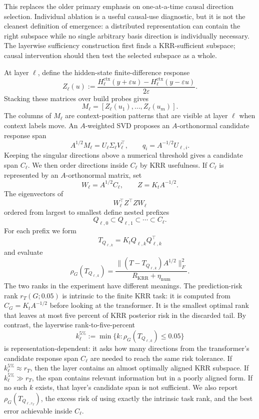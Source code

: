 \documentclass[11pt]{article}
\begin{document}
This replaces the older primary emphasis on one-at-a-time causal direction selection. Individual
ablation is a useful causal-use diagnostic, but it is not the cleanest definition of emergence: a
distributed representation can contain the right subspace while no single arbitrary basis direction
is individually necessary. The layerwise sufficiency construction first finds a KRR-sufficient
subspace; causal intervention should then test the selected subspace as a whole.

At layer \(\ell\), define the hidden-state finite-difference response
\[
Z_\ell(u)
:=
\frac{
H_\ell^{\mathrm{ctx}}(y+\varepsilon u)-H_\ell^{\mathrm{ctx}}(y-\varepsilon u)
}{2\varepsilon}.
\]
Stacking these matrices over build probes gives
\[
M_\ell=[Z_\ell(u_1),\ldots,Z_\ell(u_m)].
\]
The columns of \(M_\ell\) are context-position patterns that are visible at layer \(\ell\) when
context labels move. An \(A\)-weighted SVD proposes an \(A\)-orthonormal candidate response span
\[
A^{1/2}M_\ell=U_\ell\Sigma_\ell V_\ell^\top,
\qquad
q_i=A^{-1/2}U_{\ell,i}.
\]
Keeping the singular directions above a numerical threshold gives a candidate span \(C_\ell\). We
then order directions inside \(C_\ell\) by KRR usefulness. If \(C_\ell\) is represented by an
\(A\)-orthonormal matrix, set
\[
W_\ell=A^{1/2}C_\ell,
\qquad
Z=K_tA^{-1/2}.
\]
The eigenvectors of
\[
W_\ell^\top Z^\top ZW_\ell
\]
ordered from largest to smallest define nested prefixes
\[
Q_{\ell,0}\subset Q_{\ell,1}\subset\cdots\subset C_\ell.
\]
For each prefix we form
\[
T_{Q_{\ell,k}}=K_tQ_{\ell,k}Q_{\ell,k}^\top
\]
and evaluate
\[
\rho_G(T_{Q_{\ell,k}})
=
\frac{\|(T-T_{Q_{\ell,k}})A^{1/2}\|_F^2}{R_{\mathrm{KRR}}+\eta_{\mathrm{num}}}.
\]
The two ranks in the experiment have different meanings. The prediction-risk rank
\(r_T(G;0.05)\) is intrinsic to the finite KRR task: it is computed from
\(C_G=K_tA^{-1/2}\) before looking at the transformer. It is the smallest optimal rank that leaves
at most five percent of KRR posterior risk in the discarded tail. By contrast, the layerwise
rank-to-five-percent
\[
k_\ell^{5\%}
:=
\min\{k:\rho_G(T_{Q_{\ell,k}})\le0.05\}
\]
is representation-dependent: it asks how many directions from the transformer's candidate response
span \(C_\ell\) are needed to reach the same risk tolerance. If \(k_\ell^{5\%}\approx r_T\), then
the layer contains an almost optimally aligned KRR subspace. If \(k_\ell^{5\%}\gg r_T\), the span
contains relevant information but in a poorly aligned form. If no such \(k\) exists, that layer's
candidate span is not sufficient. We also report \(\rho_G(T_{Q_{\ell,r_T}})\), the excess risk of
using exactly the intrinsic task rank, and the best error achievable inside \(C_\ell\).
\end{document}
